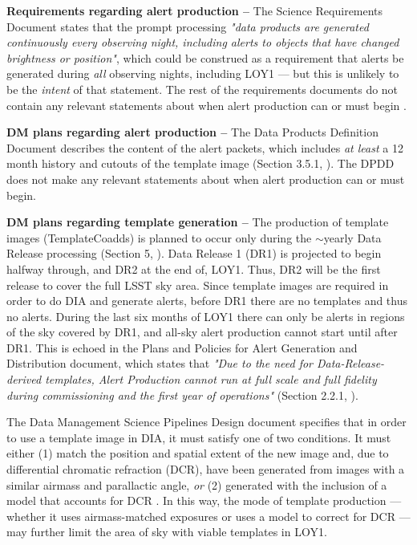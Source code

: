 \documentclass[DM,lsstdraft,toc]{lsstdoc}
\begin{document}
{\bf Requirements regarding alert production --} The Science Requirements Document  states that the prompt processing {\it "data products are generated continuously every observing night, including alerts to objects that have changed brightness or position"}, which could be construed as a requirement that alerts be generated during {\it all} observing nights, including LOY1 --- but this is unlikely to be the {\em intent} of that statement. The rest of the requirements documents do not contain any relevant statements about when alert production can or must begin .

{\bf DM plans regarding alert production --} The Data Products Definition Document describes the content of the alert packets, which includes {\em at least} a 12 month history and cutouts of the template image (Section 3.5.1, ). The DPDD does not make any relevant statements about when alert production can or must begin.

{\bf DM plans regarding template generation --} The production of template images (TemplateCoadds) is planned to occur only during the $\sim$yearly Data Release processing (Section 5, ). Data Release 1 (DR1) is projected to begin halfway through, and DR2 at the end of, LOY1. Thus, DR2 will be the first release to cover the full LSST sky area. Since template images are required in order to do DIA and generate alerts, before DR1 there are no templates and thus no alerts. During the last six months of LOY1 there can only be alerts in regions of the sky covered by DR1, and all-sky alert production cannot start until after DR1. This is echoed in the Plans and Policies for Alert Generation and Distribution document, which states that {\it "Due to the need for Data-Release-derived templates, Alert Production cannot run at full scale and full fidelity during commissioning and the first year of operations"} (Section 2.2.1, ).

The Data Management Science Pipelines Design document specifies that in order to use a template image in DIA, it must satisfy one of two conditions. It must either (1) match the position and spatial extent of the new image and, due to differential chromatic refraction (DCR), have been generated from images with a similar airmass and parallactic angle, {\em or} (2) generated with the inclusion of a model that accounts for DCR . In this way, the mode of template production --- whether it uses airmass-matched exposures or uses a model to correct for DCR --- may further limit the area of sky with viable templates in LOY1.
\end{document}
